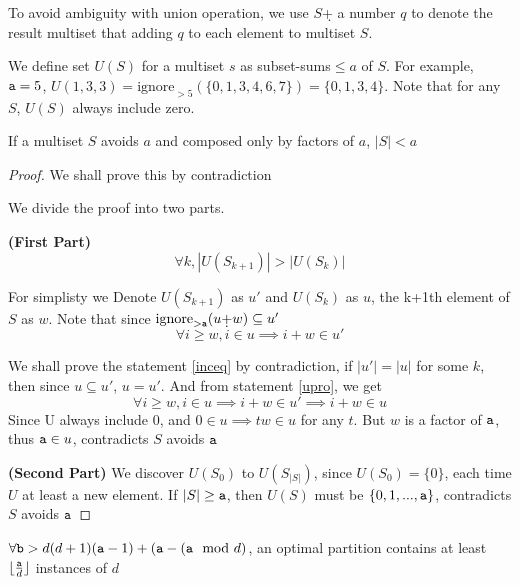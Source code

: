 To avoid ambiguity with union operation, we use $S$\d{+} a number $q$ to denote the result multiset that adding $q$ to each element to multiset $S$.

We define set $U(S)$ for a multiset $s$ as subset-sums$\leq a$ of $S$. For example, $\mathtt{a}=5$, $U({1,3,3})=\text{ignore}_{>5}(\{ 0,1,3,4,6,7\})=\{ 0,1,3,4\}$. Note that for any $S$, $U(S)$ always include zero.

\begin{lemma}
If a multiset $S$ avoids $a$ and composed only by factors of $a$, $|S|<a$
\end{lemma}

\begin{proof}

We shall prove this by contradiction

We divide the proof into two parts.

{\bf(First Part)} 
\begin{equation}\label{inceq}
\forall k, |U(S_{k+1})|>|U(S_k)|
\end{equation}

For simplisty we Denote $U(S_{k+1})$ as $u'$ and $U(S_k)$ as $u$, the k+1th element of $S$ as $w$.
Note that since $\text{ignore}_{>\pa}(u\text{\d{+}}w)\subseteq u'$
\begin{equation}\label{upro}
\forall i\geq w, i \in u\implies i+w\in u'
\end{equation}

We shall prove the statement \ref{inceq} by contradiction, if $|u'|=|u|$ for some $k$, then since $u\subseteq u'$, $u=u'$. And from statement \ref{upro}, we get
\[
\forall i\geq w, i \in u\implies i+w\in u'\implies i+w\in u
\]
Since U always include 0, and $0\in u \implies tw\in u$ for any $t$.
But $w$ is a factor of $\mathtt{a}$, thus $\mathtt{a}\in u$, contradicts $S$ avoids $\mathtt{a}$

{\bf(Second Part)} We discover $U(S_0)$ to $U(S_{|S|})$, since $U(S_0)=\{0\}$, each time
$U$ at least a new element. If $|S|\geq \mathtt{a}$, then $U(S)$
must be $\{0,1,...,\mathtt{a}\}$, contradicts $S$ avoids $\mathtt{a}$


\end{proof}

\begin{theorem} 
$\forall \mathtt{b}>d(d+1)(\mathtt{a}-1)  + (\mathtt{a} - (\mathtt{a}\mod d)$, an optimal partition contains at least $\lfloor{\frac{\mathtt{a}}{d}}\rfloor$ instances of $d$
\end{theorem}

